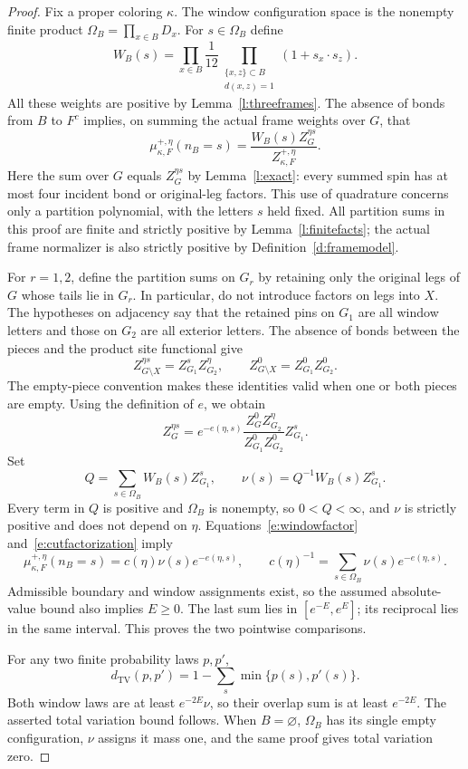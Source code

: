 \begin{proof}
Fix a proper coloring \(\kappa\).  The window configuration space
is the nonempty finite product \(\Omega_B=\prod_{x\in B}D_x\).
For \(s\in\Omega_B\) define
\[
 W_B(s)=\prod_{x\in B}\frac1{12}
       \prod_{\substack{\{x,z\}\subset B\\d(x,z)=1}}
                       (1+s_x\cdot s_z).
\]
All these weights are positive by Lemma~\ref{l:threeframes}.
The absence of bonds from \(B\) to \(F^c\) implies, on summing
the actual frame weights over \(G\), that
\begin{equation}\label{e:windowfactor}
 \mu^{+,\eta}_{\kappa,F}(n_B=s)
       =\frac{W_B(s)Z_G^{\eta s}}
                    {Z^{+,\eta}_{\kappa,F}}.
\end{equation}
Here the sum over \(G\) equals \(Z_G^{\eta s}\) by
Lemma~\ref{l:exact}: every summed spin has at most four incident
bond or original-leg factors.  This use of quadrature concerns
only a partition polynomial, with the letters \(s\) held fixed.
All partition sums in this proof are finite and strictly positive
by Lemma~\ref{l:finitefacts}; the actual frame normalizer is also
strictly positive by Definition~\ref{d:framemodel}.

For \(r=1,2\), define the partition sums on \(G_r\) by retaining
only the original legs of \(G\) whose tails lie in \(G_r\).
In particular, do not introduce factors on legs into \(X\).
The hypotheses on adjacency say that the retained pins on \(G_1\)
are all window letters and those on \(G_2\) are all exterior
letters.  The absence of bonds between the pieces and the product
site functional give
\begin{equation}\label{e:cutfactorization}
 Z_{G\setminus X}^{\eta s}=Z_{G_1}^{s}Z_{G_2}^{\eta},
 \qquad
 Z_{G\setminus X}^{0}=Z_{G_1}^{0}Z_{G_2}^{0}.
\end{equation}
The empty-piece convention makes these identities valid when
one or both pieces are empty.  Using the definition of \(e\),
we obtain
\[
 Z_G^{\eta s}
   =e^{-e(\eta,s)}
       \frac{Z_G^0 Z_{G_2}^{\eta}}{Z_{G_1}^0Z_{G_2}^0}
       Z_{G_1}^{s}.
\]
Set
\[
 Q=\sum_{s\in\Omega_B}W_B(s)Z_{G_1}^{s},\qquad
 \nu(s)=Q^{-1}W_B(s)Z_{G_1}^{s}.
\]
Every term in \(Q\) is positive and \(\Omega_B\) is nonempty,
so \(0<Q<\infty\), and \(\nu\) is strictly positive and does
not depend on \(\eta\).  Equations~\eqref{e:windowfactor}
and~\eqref{e:cutfactorization} imply
\[
 \mu^{+,\eta}_{\kappa,F}(n_B=s)
       =c(\eta)\nu(s)e^{-e(\eta,s)},\qquad
 c(\eta)^{-1}=\sum_{s\in\Omega_B}\nu(s)e^{-e(\eta,s)}.
\]
Admissible boundary and window assignments exist, so the assumed
absolute-value bound also implies \(E\ge0\).  The last sum lies
in \([e^{-E},e^E]\); its reciprocal lies in the same interval.
This proves the two pointwise comparisons.

For any two finite probability laws \(p,p'\),
\[
 d_{\mathrm{TV}}(p,p')
    =1-\sum_s\min\{p(s),p'(s)\}.
\]
Both window laws are at least \(e^{-2E}\nu\), so their overlap
sum is at least \(e^{-2E}\).  The asserted total variation bound
follows.  When \(B=\varnothing\), \(\Omega_B\) has its single
empty configuration, \(\nu\) assigns it mass one, and the same
proof gives total variation zero.
\end{proof}

